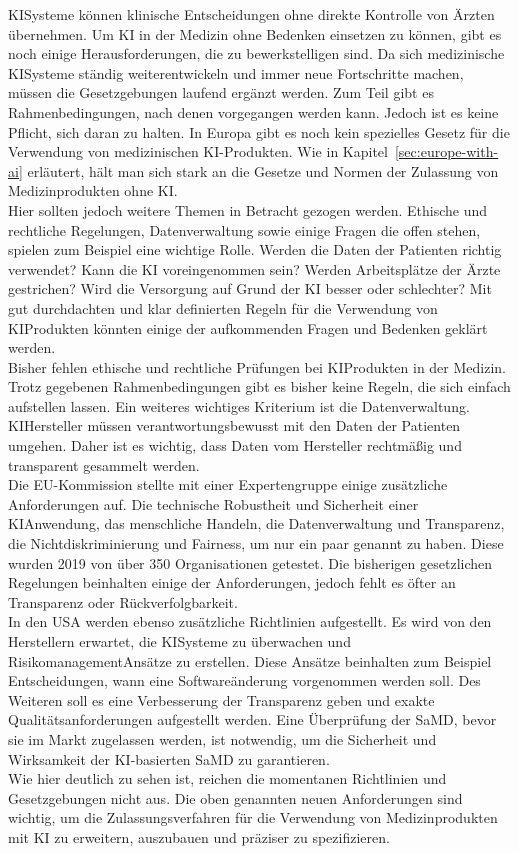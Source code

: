KI\-Systeme können klinische Entscheidungen ohne direkte Kontrolle von Ärzten übernehmen.\cite{Lessons_Learned_about_ai}
Um KI in der Medizin ohne Bedenken einsetzen zu können, gibt es noch einige Herausforderungen, die zu bewerkstelligen sind. 
Da sich medizinische KI\-Systeme ständig weiterentwickeln und immer neue Fortschritte machen, 
müssen die Gesetzgebungen laufend ergänzt werden. 
Zum Teil gibt es Rahmenbedingungen, nach denen vorgegangen werden kann. 
Jedoch ist es keine Pflicht, sich daran zu halten.
In Europa gibt es noch kein spezielles Gesetz für die Verwendung von medizinischen KI-Produkten. 
Wie in Kapitel~\ref{sec:europe-with-ai} erläutert, 
hält man sich stark an die Gesetze und Normen der Zulassung von Medizinprodukten ohne KI.\\ 
Hier sollten jedoch weitere Themen in Betracht gezogen werden. Ethische und rechtliche Regelungen, Datenverwaltung sowie einige Fragen die offen stehen, 
spielen zum Beispiel eine wichtige Rolle. 
Werden die Daten der Patienten richtig verwendet? Kann die KI voreingenommen sein?
Werden Arbeitsplätze der Ärzte gestrichen? 
Wird die Versorgung auf Grund der KI besser oder schlechter? 
Mit gut durchdachten und klar definierten Regeln für die Verwendung von KI\-Produkten könnten einige
der aufkommenden Fragen und Bedenken geklärt werden.\\
Bisher fehlen ethische und rechtliche Prüfungen bei KI\-Produkten in der Medizin. 
Trotz gegebenen Rahmenbedingungen gibt es bisher keine Regeln, die sich einfach aufstellen lassen. 
Ein weiteres wichtiges Kriterium ist die Datenverwaltung. 
KI\-Hersteller müssen verantwortungsbewusst mit den Daten der Patienten umgehen. 
Daher ist es wichtig, dass Daten vom Hersteller rechtmäßig und transparent gesammelt werden.\cite{Lessons_Learned_about_ai}\\
Die EU-Kommission stellte mit einer Expertengruppe einige zusätzliche Anforderungen auf. 
Die technische Robustheit und Sicherheit einer KI\-Anwendung, das menschliche Handeln, 
die Datenverwaltung und Transparenz, die Nichtdiskriminierung und Fairness, 
um nur ein paar genannt zu haben. 
Diese wurden 2019 von über 350 Organisationen getestet. 
Die bisherigen gesetzlichen Regelungen beinhalten einige der Anforderungen, 
jedoch fehlt es öfter an Transparenz oder Rückverfolgbarkeit.\cite{whitepaper}\\
In den USA werden ebenso zusätzliche Richtlinien aufgestellt.
Es wird von den Herstellern erwartet, 
die KI\-Systeme zu überwachen und Risikomanagement\-Ansätze zu erstellen. 
Diese Ansätze beinhalten zum Beispiel Entscheidungen, 
wann eine Softwareänderung vorgenommen werden soll. 
Des Weiteren soll es eine Verbesserung der Transparenz geben 
und exakte Qualitätsanforderungen aufgestellt werden. Eine Überprüfung der SaMD,
bevor sie im Markt zugelassen werden, ist notwendig, 
um die Sicherheit und Wirksamkeit der KI-basierten SaMD zu garantieren.\cite{fda_original}\\
Wie hier deutlich zu sehen ist,
reichen die momentanen Richtlinien und Gesetzgebungen nicht aus. 
Die oben genannten neuen Anforderungen sind wichtig, 
um die Zulassungsverfahren für die Verwendung von Medizinprodukten mit KI zu erweitern,
auszubauen und präziser zu spezifizieren.